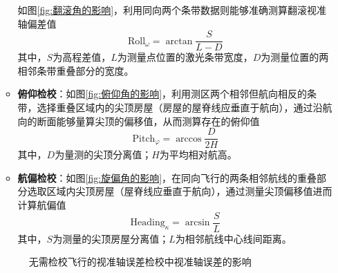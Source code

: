 \begin{enumerate}
\begin{itemize}
			如图\ref{fig:翻滚角的影响}，利用同向两个条带数据则能够准确测算翻滚视准轴偏差值
			\begin{equation}
			\text{Roll}_ω = \arctan \dfrac{S}{L-D}
			\end{equation}
			其中，$ S $为高程差值，$ L $为测量点位置的激光条带宽度，$ D $为测量位置的两相邻条带重叠部分的宽度。
			\item \textbf{俯仰检校}：如图\ref{fig:俯仰角的影响}，利用测区两个相邻但航向相反的条带，选择重叠区域内的尖顶房屋（房屋的屋脊线应垂直于航向），通过沿航向的断面能够量算尖顶的偏移值，从而测算存在的俯仰值
			\begin{equation}
			\text{Pitch}_φ = \arccos \dfrac{D}{2H}
			\end{equation}
			其中，$ D $为量测的尖顶分离值；$ H $为平均相对航高。
			\item \textbf{航偏检校}：如图\ref{fig:旋偏角的影响}，在同向飞行的两条相邻航线的重叠部分选取区域内尖顶房屋（屋脊线应垂直于航向），通过测量尖顶偏移值进而计算航偏值
			\begin{equation}
			\text{Heading}_κ = \arcsin \dfrac{S}{L}
			\end{equation}
			其中，$ S $为测量的尖顶房屋分离值；$ L $为相邻航线中心线间距离。
		\end{itemize}
		\begin{figure}[htbp]
			\centering
			\hspace{3em}
			\hspace{3em}
			\caption{无需检校飞行的视准轴误差检校中视准轴误差的影响}
			\label{fig:无需检校飞行的视准轴误差检校中视准轴误差的影响}
		\end{figure}
\end{enumerate}

